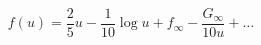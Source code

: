 \begin{equation}f(u)=\frac{2}{5} u-\frac{1}{10} \log u + f_{\infty} -\frac{G_{\infty}}{10 u}+\ldots \end{equation}

